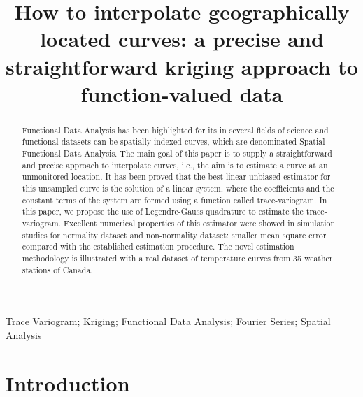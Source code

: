 \documentclass[12pt]{interact}
\theoremstyle{plain}%
\theoremstyle{definition}
\theoremstyle{remark}
\begin{document}

\title{How to interpolate geographically located curves: a precise and straightforward kriging approach to function-valued data}


\maketitle

\begin{abstract}
Functional Data Analysis has been highlighted for its in several fields of science and functional datasets can be spatially indexed curves, which are denominated Spatial Functional Data Analysis. The main goal of this paper is to supply a straightforward and precise approach to interpolate curves, i.e., the aim is to estimate a curve at an unmonitored location. It has been proved that the best linear unbiased estimator for this unsampled curve is the solution of a linear system, where the coefficients and the constant terms of the system are formed using a function called trace-variogram. In this paper, we propose the use of Legendre-Gauss quadrature to estimate the trace-variogram. Excellent numerical properties of this estimator were showed in simulation studies for normality dataset and non-normality dataset: smaller mean square error compared with the established estimation procedure. The novel estimation methodology is illustrated with a real dataset of temperature curves from 35 weather stations of Canada.
\end{abstract}

\begin{keywords}
Trace Variogram; Kriging; Functional Data Analysis; Fourier Series; Spatial Analysis
\end{keywords}


\section{Introduction}\label{introduction}
\end{document}

